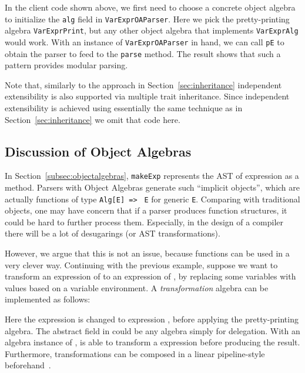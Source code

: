 In the client code shown above, we first need to choose a concrete
object algebra to initialize the \lstinline{alg} field in \lstinline{VarExprOAParser}. Here we pick the
pretty-printing algebra \lstinline{VarExprPrint}, but any other object
algebra that implements \lstinline{VarExprAlg} would work.
With an instance of \lstinline{VarExprOAParser} in hand, we can call
\lstinline{pE} to obtain the parser to feed to the \lstinline{parse} method.
The result shows that such a pattern provides modular parsing.

Note that, similarly to the approach in Section~\ref{sec:inheritance} independent extensibility is also supported via multiple trait inheritance.
Since independent extensibility is achieved using essentially the same technique as in Section~\ref{sec:inheritance} we omit that code here.

\subsection{Discussion of Object Algebras}\label{subsec:more-oa}

In Section~\ref{subsec:objectalgebras}, \lstinline{makeExp} represents the AST of expression  as a method. Parsers with Object Algebras generate such ``implicit objects'', which are actually functions of type \lstinline{Alg[E] => } \lstinline{E} for generic \lstinline{E}. Comparing with traditional objects, one may have concern that if a parser produces function structures, it could be hard to further process them. Especially, in the design of a compiler there will be a lot of desugarings (or AST transformations).

However, we argue that this is not an issue, because functions can be used
in a very clever way. Continuing with the previous example, suppose we want to transform an expression of  to an expression of , by
replacing some variables with values based on a variable environment. A \textit{transformation} algebra can be implemented as follows:

Here the  expression  is changed to  expression , before applying the pretty-printing algebra. The abstract field
 in  could be any algebra simply for delegation. With an algebra instance of ,  is able to transform a  expression before producing the result. Furthermore, transformations can be composed in a linear pipeline-style beforehand~\cite{Zhang2015}.

